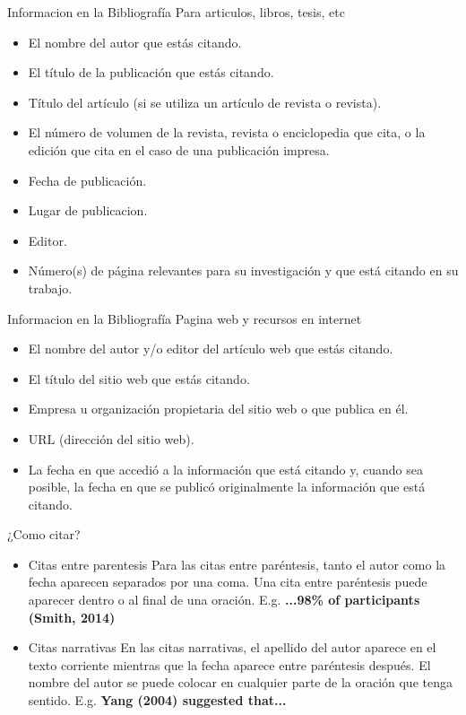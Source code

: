 \documentclass[
10pt,
aspectratio=169,
]{beamer}
\begin{document}
\begin{frame}{Informacion en la Bibliograf\'ia}
Para articulos, libros, tesis, etc
\begin{itemize}
\item El nombre del autor que estás citando.
\item El título de la publicación que estás citando.
\item Título del artículo (si se utiliza un artículo de revista o revista).
\item El número de volumen de la revista, revista o enciclopedia que cita, o la edición que cita en el caso de una publicación impresa.
\item Fecha de publicación.
\item Lugar de publicacion.
\item Editor.
\item Número(s) de página relevantes para su investigación y que está citando en su trabajo.
\end{itemize}
\end{frame}

\begin{frame}{Informacion en la Bibliograf\'ia}
Pagina web y recursos en internet
\begin{itemize}
\item El nombre del autor y/o editor del artículo web que estás citando.
\item  El título del sitio web que estás citando.
\item  Empresa u organización propietaria del sitio web o que publica en él.
\item  URL (dirección del sitio web).
\item La fecha en que accedió a la información que está citando y, cuando sea posible, la fecha en que se publicó originalmente la información que está citando.
\end{itemize}
\end{frame}

\begin{frame}{¿Como citar?}
\begin{itemize}
\item Citas entre parentesis
Para las citas entre paréntesis, tanto el autor como la fecha aparecen separados por una coma. Una cita entre paréntesis puede aparecer dentro o al final de una oración. E.g. \textbf{...98\% of participants \alert{(Smith, 2014)}}
\item Citas narrativas
En las citas narrativas, el apellido del autor aparece en el texto corriente mientras que la fecha aparece entre paréntesis después. El nombre del autor se puede colocar en cualquier parte de la oración que tenga sentido. E.g. \textbf{\alert{Yang (2004)} suggested that...}
\end{itemize}
\end{frame}
\end{document}
